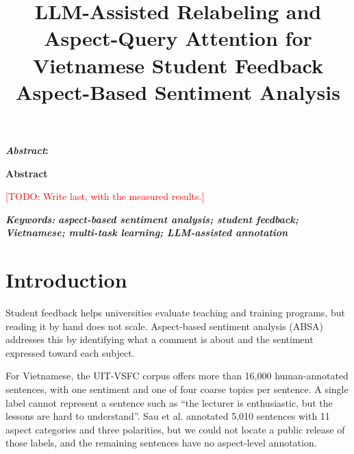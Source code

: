 \documentclass[9pt, conference, a4paper, compsocconf]{IEEEtran}
\makeatletter
\renewenvironment{abstract}
  {\normalfont
   \if@twocolumn
     \@IEEEabskeysecsize\bfseries\textit{\abstractname}: 
   \else
     \begin{center}\@IEEEabskeysecsize\textbf{\abstractname}\end{center}
     \@IEEEabskeysecsize
     \setlength{\parindent}{0pt}   %
     \noindent
   \fi}
  {\par}
\renewenvironment{abstract}
  {\normalfont
   \@IEEEabskeysecsize
   \setlength{\parindent}{0pt}
   \noindent
   \if@twocolumn
     \bfseries\textit{\abstractname}: 
   \else
     \begin{center}\textbf{\abstractname}\end{center}
   \fi}
  {\par}
\renewenvironment{IEEEkeywords}
  {\normalfont
   \@IEEEabskeysecsize
   \vspace{0.3em}       
   \setlength{\parindent}{0pt}
   \noindent
   {\bfseries\itshape \IEEEkeywordsname: }\ignorespaces}
  {\par}
\renewcommand{\abstractname}{Abstract}
\renewcommand{\IEEEkeywordsname}{Keywords}
\newif\ifanon
\newcommand{\TODO}[1]{\textcolor{red}{[TODO: #1]}}
\makeatother
\begin{document}
\fontsize{9}{10}
\selectfont


\title{LLM-Assisted Relabeling and Aspect-Query Attention for Vietnamese Student Feedback Aspect-Based Sentiment Analysis}

\ifanon
\author{\IEEEauthorblockN{Anonymous Authors}\IEEEauthorblockA{Anonymous Affiliation}}
\else
\author{
}
\fi

\maketitle

\begin{abstract}
\TODO{Write last, with the measured results.}
\end{abstract}

\begin{IEEEkeywords}
\textbf{\textit{aspect-based sentiment analysis; student feedback; Vietnamese; multi-task learning; LLM-assisted annotation}}
\end{IEEEkeywords}

\IEEEpeerreviewmaketitle

\section{Introduction}
Student feedback helps universities evaluate teaching and training programs, but reading it by hand does not scale. Aspect-based sentiment analysis (ABSA) \cite{pontiki2014semeval,pontiki2016semeval} addresses this by identifying what a comment is about and the sentiment expressed toward each subject.

For Vietnamese, the UIT-VSFC corpus \cite{nguyen2018uitvsfc} offers more than 16,000 human-annotated sentences, with one sentiment and one of four coarse topics per sentence. A single label cannot represent a sentence such as ``the lecturer is enthusiastic, but the lessons are hard to understand''. Sau et al. \cite{sau2021absa} annotated 5,010 sentences with 11 aspect categories and three polarities, but we could not locate a public release of those labels, and the remaining sentences have no aspect-level annotation.
\end{document}

